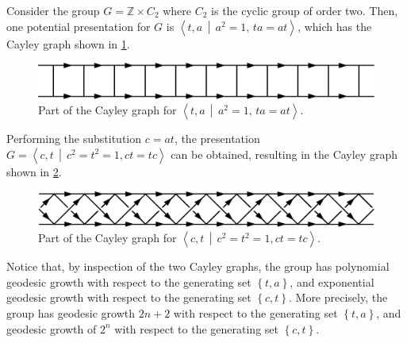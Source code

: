 \begin{example}
	Consider the group $G = \mathbb{Z} \times C_2$ where $C_2$ is the cyclic group of order two.
	Then, one potential presentation for $G$ is
	$
	  \left\langle
		  t,a
		  \, \middle\vert \,
		  a^2 = 1,\,
		  ta = at
	  \right\rangle
	$,
	which has the Cayley graph shown in \cref{fig:cg1}.
	
	\begin{figure}[h!]
		\centering
		
		\includegraphics[width=0.85\linewidth]{figures/chapterNotation/fig1}
		
		\caption{Part of the Cayley graph for $
			\left\langle
			t,a
			\, \middle\vert \,
			a^2 = 1,\,
			ta = at
			\right\rangle
			$.}
		\label{fig:cg1}
	\end{figure}

	Performing the substitution $c = at$, the presentation
	$
	  G =
	  \left\langle
	  c,t
	  \, \middle\vert \,
	  c^2 = t^2 = 1,
	  ct = tc
	  \right\rangle
	$
	can be obtained, resulting in the Cayley graph shown in \cref{fig:cg2}.
	
	\begin{figure}[h!]
		\centering
		
		\includegraphics[width=0.85\linewidth]{figures/chapterNotation/fig2}
		
		\caption{Part of the Cayley graph for $  \left\langle
		  c,t
		  \, \middle\vert \,
		  c^2 = t^2 = 1,
		  ct = tc
		  \right\rangle$.}
		\label{fig:cg2}
	\end{figure}

	Notice that, by inspection of the two Cayley graphs, the group has polynomial geodesic growth with respect to the generating set $\left\lbrace t,a \right\rbrace$, and exponential geodesic growth with respect to the generating set $\left\lbrace c,t \right\rbrace$.
	More precisely, the group has geodesic growth $2n+2$  with respect to the generating set $\left\lbrace t,a \right\rbrace$, and geodesic growth of $2^n$  with respect to the generating set $\left\lbrace c,t \right\rbrace$.
\end{example}

